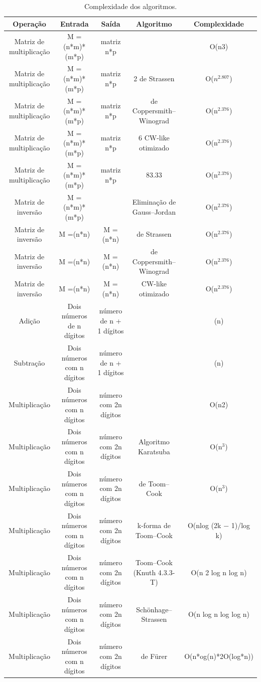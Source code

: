 \documentclass[letterpaper, 10 pt, conference]{ieeeconf}
\begin{document}
\begin{table}[!hbt]
\begin{tabular}{|c|c|c|c|c|}
	\hline
	Operação  & Entrada & Saída & Algoritmo & Complexidade \\
	\hline\hline
	Matriz de multiplicação & M =(n*m)*(m*p) & matriz n*p & & O(n3) \\
	\hline
	Matriz de multiplicação & M =(n*m)*(m*p) & matriz n*p &2 de Strassen & O($n^{2.807}$)\\
	\hline
	Matriz de multiplicação & M =(n*m)*(m*p) & matriz n*p & de Coppersmith–Winograd & O(n$^{2.376}$) \\
	\hline
	Matriz de multiplicação & M =(n*m)*(m*p) & matriz n*p &6 CW-like otimizado &O(n$^{2.376}$)\\
	\hline
	Matriz de multiplicação &  M =(n*m)*(m*p) & matriz n*p &83.33 &O(n$^{2.376}$)\\
	\hline
	Matriz de inversão & M =(n*m)*(m*p) & & Eliminação de Gauss–Jordan &O(n$^{2.376}$)\\
	\hline
	Matriz de inversão & M =(n*n)  & M =(n*n) & de Strassen &O(n$^{2.376}$)\\
	\hline
	Matriz de inversão & M =(n*n)  & M =(n*n) & de Coppersmith–Winograd & O(n$^{2.376}$)\\
	\hline
	Matriz de inversão & M =(n*n) & M =(n*n) & CW-like otimizado & O(n$^{2.376}$) \\
	\hline
	Adição & Dois números de n dígitos &  número de n + 1 dígitos & & \Θ(n)\\
	\hline
	Subtração & Dois números com n dígitos  & número de n + 1 dígitos & & \Θ(n)\\
	\hline
	Multiplicação & Dois números com n dígitos & número com 2n dígitos &  & O(n2)\\
	\hline
	Multiplicação & Dois números com n dígitos & número com 2n dígitos & Algoritmo Karatsuba & O(n$^3$)\\
	\hline
	Multiplicação & Dois números com n dígitos & número com 2n dígitos & de Toom–Cook & O(n$^3$)\\
	\hline
	Multiplicação & Dois números com n dígitos & número com 2n dígitos & k-forma de Toom–Cook & O(nlog (2k − 1)/log k)\\
	\hline
	Multiplicação & Dois números com n dígitos & número com 2n dígitos & Toom–Cook (Knuth 4.3.3-T) & O(n 2\sqrt{2} log n log n)\\
	\hline
	Multiplicação & Dois números com n dígitos & número com 2n dígitos & Schönhage–Strassen & O(n log n log log n)\\
	\hline
	Multiplicação & Dois números com n dígitos & número com 2n dígitos &  de Fürer & O(n*og(n)*2O(log*n))\\
	\hline
\end{tabular}
\caption{Complexidade dos algoritmos.}
\label{t1}
\end{table}
\end{document}
